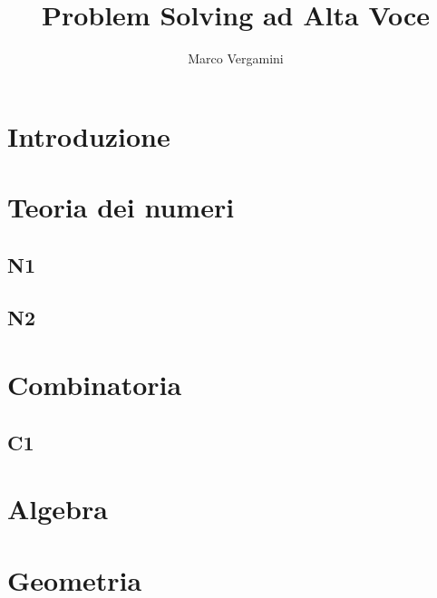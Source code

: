 \documentclass{article}
\title{Problem Solving ad Alta Voce}
\date{}
\author{Marco Vergamini}
\begin{document}
\maketitle
\newpage
\tableofcontents
\newpage


\section*{Introduzione}


\newpage

\section{Teoria dei numeri}

\subsection{N1}


\subsection{N2}


\newpage

\section{Combinatoria}

\subsection{C1}


\newpage

\section{Algebra}

\newpage

\section{Geometria}
\end{document}
